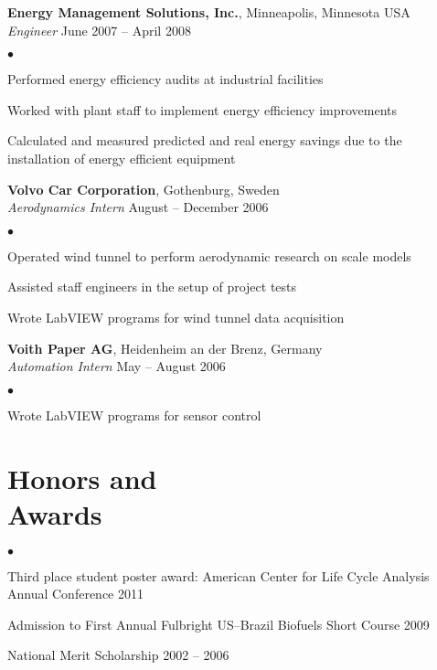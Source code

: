 \documentclass[margin,line,10pt]{res}
\newenvironment{list2}{
  \begin{list}{$\bullet$}{%
      \setlength{\itemsep}{0in}
      \setlength{\parsep}{0in} \setlength{\parskip}{0in}
      \setlength{\topsep}{0in} \setlength{\partopsep}{0in} 
      \setlength{\leftmargin}{0.2in}}}{\end{list}}
\begin{document}
\begin{resume}
{\bf Energy Management Solutions, Inc.}, Minneapolis, Minnesota USA\\
\vspace{-.3cm}
{\em Engineer} \hfill June 2007 -- April 2008\\
\begin{list2}
\item Performed energy efficiency audits at industrial facilities
\item Worked with plant staff to implement energy efficiency improvements
\item Calculated and measured predicted and real energy savings due to the installation of energy efficient equipment
\end{list2}

\vspace*{-.1in}

{\bf Volvo Car Corporation}, Gothenburg, Sweden\\
\vspace{-.3cm}
{\em Aerodynamics Intern} \hfill August -- December 2006\\
\begin{list2}
\item Operated wind tunnel to perform aerodynamic research on scale models
\item Assisted staff engineers in the setup of project tests
\item Wrote LabVIEW programs for wind tunnel data acquisition
\end{list2}

\vspace*{-.1in}

{\bf Voith Paper AG}, Heidenheim an der Brenz, Germany\\
\vspace{-.3cm}
{\em Automation Intern} \hfill May -- August 2006\\
\begin{list2}
\item Wrote LabVIEW programs for sensor control
\end{list2}

\section{\sc Honors and\\Awards} 
\begin{list2}
\item Third place student poster award: American Center for
Life Cycle Analysis Annual Conference \hfill 2011
\item Admission to First Annual Fulbright US--Brazil Biofuels Short Course \hfill 2009
\item National Merit Scholarship			\hfill 2002 -- 2006\\
\end{list2}

\vspace*{-.2in}




\end{resume}
\end{document}
